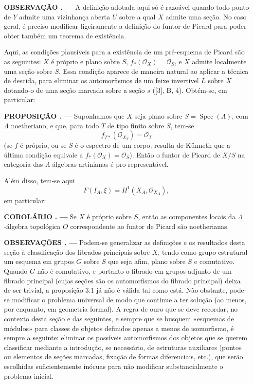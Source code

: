 \documentclass[11pt,twoside,openany]{book}
\numberwithin{equation}{section}
\newcommand{\src}[1]{%
  \phantomsection\hypertarget{src:#1}{}%
  \marginpar{\raggedleft\footnotesize\sffamily #1}%
}
\theoremstyle{plain}
\theoremstyle{definition}
\theoremstyle{remark}
\newcommand{\result}[2]{%
  \par\medskip\noindent\textbf{#1%
  \if\relax\detokenize{#2}\relax\else\space#2\fi. ---}\enspace
}
\newcommand{\FgaUnitKey}{frontmatter}
\renewcommand{\src}[1]{%
  \phantomsection\hypertarget{src:\FgaUnitKey:#1}{}%
  \marginpar{\raggedleft\footnotesize\sffamily #1}%
}
\begin{document}
\result{OBSERVAÇÃO}{} A definição adotada aqui só é razoável quando
todo ponto de $Y$ admite uma vizinhança
aberta $U$ sobre a qual $X$ admite uma seção. No caso geral, é preciso
modificar ligeiramente a definição do funtor de Picard para poder obter
também um teorema de existência.

Aqui, as condições plausíveis para a existência de um pré-esquema de Picard
são as seguintes: $X$ é próprio e plano sobre $S$,
$f_*(\mathcal O_X)=\mathcal O_S$, e $X$ admite localmente uma seção sobre
$S$. Essa condição aparece de maneira natural ao aplicar a técnica de
descida, para eliminar os automorfismos de um feixe invertível $L$ sobre $X$
dotando-o de uma seção marcada sobre a seção $s$ ([3], B, 4). Obtém-se,
em particular:

\src{384}
\result{PROPOSIÇÃO}{3.1} Suponhamos que $X$ seja plano sobre
$S=\operatorname{Spec}(\Lambda)$, com $\Lambda$ noetheriano, e que, para todo
$T$ de tipo finito sobre $S$, tem-se
\[
  f_{T*}(\mathcal O_{X_T})=\mathcal O_T
\]
(se $f$ é próprio, ou se $S$ é o espectro
de um corpo, resulta de Künneth que a última condição equivale a
$f_*(\mathcal O_X)=\mathcal O_S$). Então o funtor de Picard de $X/S$ na
categoria das $\Lambda$-álgebras artinianas é pro-representável.

Além disso, tem-se aqui
\[
  F(I_A,\xi)=H^1(X_A,\mathcal O_{X_A}),
\]
em particular:

\result{COROLÁRIO}{} Se $X$ é próprio sobre $S$, então as componentes
locais da $\Lambda$-álgebra topológica $O$ correspondente ao funtor de
Picard são noetherianas.

\result{OBSERVAÇÕES}{} Podem-se generalizar as definições e os resultados
desta seção à classificação dos fibrados principais sobre $X$, tendo como
grupo estrutural um esquema em grupos $G$ sobre $S$ que seja afim, plano sobre
$S$ e comutativo. Quando $G$ não é comutativo, e portanto o fibrado em
grupos adjunto de um fibrado principal (cujas seções são os automorfismos
do fibrado principal) deixa de ser trivial, a proposição 3.1 já não é válida
tal como está. Não obstante, pode-se modificar o problema universal de modo que
continue a ter solução (ao menos, por enquanto, em geometria formal). A regra de
ouro que se deve recordar, no contexto desta \src{385}seção e das
seguintes, e sempre que se busquem «esquemas de módulos» para classes de
objetos definidos apenas a menos de isomorfismo, é sempre a seguinte: eliminar
os possíveis automorfismos dos objetos que se querem classificar mediante
a introdução, se necessário, de estruturas auxiliares (pontos ou
elementos de seções marcadas, fixação de formas diferenciais, etc.), que
serão escolhidas suficientemente inócuas para não modificar substancialmente o
problema inicial.
\end{document}
